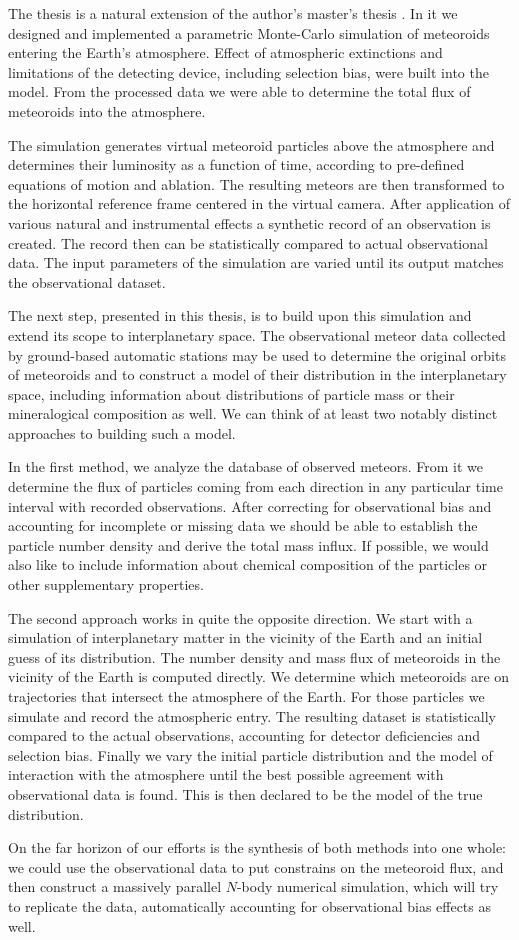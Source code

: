 The thesis is a natural extension of the author's master's thesis \citep{balaz-thesis}.
In it we designed and implemented a parametric Monte-Carlo simulation of meteoroids entering the Earth's atmosphere.
Effect of atmospheric extinctions and limitations of the detecting device, including selection bias, were built into the model.
From the processed data we were able to determine the total flux of meteoroids into the atmosphere.

The simulation generates virtual meteoroid particles above the atmosphere and determines their
luminosity as a function of time, according to pre-defined equations of motion and ablation.
The resulting meteors are then transformed to the horizontal reference frame centered in the virtual camera.
After application of various natural and instrumental effects a synthetic record of an observation is created.
The record then can be statistically compared to actual observational data.
The input parameters of the simulation are varied until its output matches the observational dataset.

The next step, presented in this thesis, is to build upon this simulation and extend its scope to interplanetary space.
The observational meteor data collected by ground-based automatic stations may be used
to determine the original orbits of meteoroids and to construct a model
of their distribution in the interplanetary space, including information
about distributions of particle mass or their mineralogical composition as well.
We can think of at least two notably distinct approaches to building such a model.

In the first method, we analyze the database of observed meteors. From it we determine
the flux of particles coming from each direction in any particular time interval with recorded observations.
After correcting for observational bias and accounting for incomplete or missing
data we should be able to establish the particle number density and derive the total mass influx.
If possible, we would also like to include information
about chemical composition of the particles or other supplementary properties.

The second approach works in quite the opposite direction. We start with a simulation
of interplanetary matter in the vicinity of the Earth and an initial guess of its distribution.
The number density and mass flux of meteoroids in the vicinity of the Earth is computed directly.
We determine which meteoroids are on trajectories that intersect the atmosphere of the Earth.
For those particles we simulate and record the atmospheric entry. The resulting dataset is statistically compared
to the actual observations, accounting for detector deficiencies and selection bias.
Finally we vary the initial particle distribution and the model of interaction with the atmosphere
until the best possible agreement with observational data is found.
This is then declared to be the model of the true distribution.

On the far horizon of our efforts is the synthesis of both methods into one whole:
we could use the observational data to put constrains on the meteoroid flux,
and then construct a massively parallel $N$-body numerical simulation,
which will try to replicate the data, automatically accounting for observational bias effects as well.

